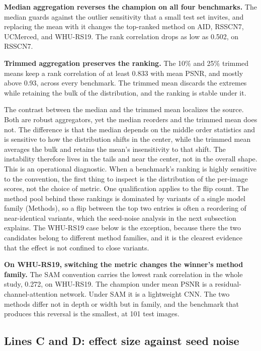 \documentclass{interact}
\begin{document}
\textbf{Median aggregation reverses the champion on all four benchmarks.} The median guards against the outlier sensitivity that a small test set invites, and replacing the mean with it changes the top-ranked method on AID, RSSCN7, UCMerced, and WHU-RS19. The rank correlation drops as low as 0.502, on RSSCN7.

\textbf{Trimmed aggregation preserves the ranking.} The 10\% and 25\% trimmed means keep a rank correlation of at least 0.833 with mean PSNR, and mostly above 0.93, across every benchmark. The trimmed mean discards the extremes while retaining the bulk of the distribution, and the ranking is stable under it.

The contrast between the median and the trimmed mean localizes the source. Both are robust aggregators, yet the median reorders and the trimmed mean does not. The difference is that the median depends on the middle order statistics and is sensitive to how the distribution shifts in the center, while the trimmed mean averages the bulk and retains the mean's insensitivity to that shift. The instability therefore lives in the tails and near the center, not in the overall shape. This is an operational diagnostic. When a benchmark's ranking is highly sensitive to the convention, the first thing to inspect is the distribution of the per-image scores, not the choice of metric. One qualification applies to the flip count. The method pool behind these rankings is dominated by variants of a single model family (Methods), so a flip between the top two entries is often a reordering of near-identical variants, which the seed-noise analysis in the next subsection explains. The WHU-RS19 case below is the exception, because there the two candidates belong to different method families, and it is the clearest evidence that the effect is not confined to close variants.

\textbf{On WHU-RS19, switching the metric changes the winner's method family.} The SAM convention carries the lowest rank correlation in the whole study, 0.272, on WHU-RS19. The champion under mean PSNR is a residual-channel-attention network. Under SAM it is a lightweight CNN. The two methods differ not in depth or width but in family, and the benchmark that produces this reversal is the smallest, at 101 test images.

\subsection{Lines C and D: effect size against seed noise}\label{sec:noise}
\end{document}
